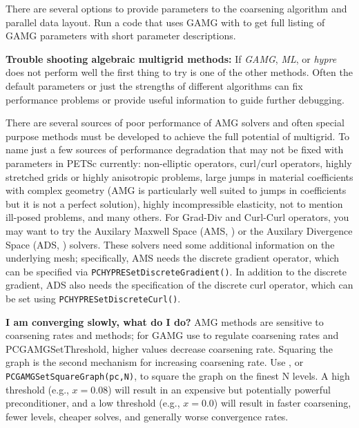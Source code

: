 There are several options to provide parameters to the coarsening algorithm and parallel data layout.
Run a code that uses GAMG with  to get full listing of GAMG parameters with short parameter descriptions.

{\bf Trouble shooting algebraic multigrid methods:}  
If {\it GAMG}, {\it ML}, or {\it hypre} does not perform well the first thing to try is one of 
the other methods. Often the default parameters or just the strengths of different algorithms can fix performance problems or provide useful information to guide further debugging.

There are several sources of poor performance of
AMG solvers and often special purpose methods must be developed to
achieve the full potential of multigrid.
To name just a few sources of performance degradation that
may not be fixed with parameters in PETSc currently: non-elliptic
operators, curl/curl operators, highly stretched grids or highly anisotropic problems,
large jumps in material coefficients with complex geometry (AMG is
particularly well suited to jumps in coefficients but it is not a
perfect solution), highly incompressible elasticity, not to mention
ill-posed problems, and many others. For Grad-Div and Curl-Curl operators,
you may want to try the Auxilary Maxwell Space (AMS, )
or the Auxilary Divergence Space (ADS, ) solvers.
These solvers need some additional information on the underlying mesh;
specifically, AMS needs the discrete gradient operator, which can be specified via
\lstinline{PCHYPRESetDiscreteGradient()}. In addition to the discrete gradient, ADS also needs the
specification of the discrete curl operator, which can be set using \lstinline{PCHYPRESetDiscreteCurl()}.

{\bf I am converging slowly, what do I do?}
AMG methods are sensitive to coarsening rates and methods; for GAMG
use  to regulate coarsening rates and
PCGAMGSetThreshold, higher values decrease coarsening rate.
Squaring the graph is the second mechanism for increasing coarsening
rate.
Use , or \lstinline{PCGAMGSetSquareGraph(pc,N)}, to square the graph on the
finest N levels.  A high threshold (e.g., $x=0.08$) will result in an
expensive but potentially powerful preconditioner, and a low threshold
(e.g., $x=0.0$) will result in faster coarsening, fewer levels,
cheaper solves, and generally worse convergence rates.

